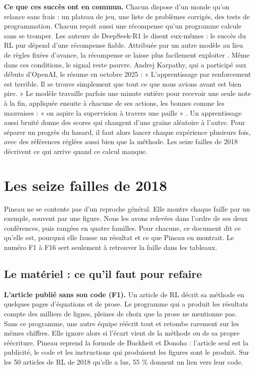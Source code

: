 \documentclass[11pt,a4paper]{article}
\begin{document}
\textbf{Ce que ces succès ont en commun.} Chacun dispose d'un monde
qu'on relance sans frais : un plateau de jeu, une liste de problèmes
corrigés, des tests de programmation. Chacun reçoit aussi une récompense
qu'un programme calcule sans se tromper. Les auteurs de DeepSeek-R1 le
disent eux-mêmes : le succès du RL pur dépend d'une récompense fiable.
Attribuée par un autre modèle au lieu de règles fixées d'avance, la
récompense se laisse plus facilement exploiter
\autocite{deepseek2025r1}. Même dans ces conditions, le signal reste
pauvre. Andrej Karpathy, qui a participé aux débuts d'OpenAI, le résume
en octobre 2025 : « L'apprentissage par renforcement est terrible. Il se
trouve simplement que tout ce que nous avions avant est bien pire. » Le
modèle travaille parfois une minute entière pour recevoir une seule note
à la fin, appliquée ensuite à chacune de ses actions, les bonnes comme
les mauvaises : « on aspire la supervision à travers une paille »
\autocite{patel2025karpathy}. Un apprentissage aussi bruité donne des
scores qui changent d'une graine aléatoire à l'autre. Pour séparer un
progrès du hasard, il faut alors lancer chaque expérience plusieurs
fois, avec des références réglées aussi bien que la méthode. Les seize
failles de 2018 décrivent ce qui arrive quand ce calcul manque.

\section{Les seize failles de 2018}\label{les-seize-failles-de-2018}

Pineau ne se contente pas d'un reproche général. Elle montre chaque
faille par un exemple, souvent par une figure. Nous les avons relevées
dans l'ordre de ses deux conférences, puis rangées en quatre familles.
Pour chacune, ce document dit ce qu'elle est, pourquoi elle fausse un
résultat et ce que Pineau en montrait. Le numéro F1 à F16 sert seulement
à retrouver la faille dans les tableaux.

\subsection{Le matériel : ce qu'il faut pour
refaire}\label{le-matuxe9riel-ce-quil-faut-pour-refaire}

\textbf{L'article publié sans son code (F1).} Un article de RL décrit sa
méthode en quelques pages d'équations et de prose. Le programme qui a
produit les résultats compte des milliers de lignes, pleines de choix
que la prose ne mentionne pas. Sans ce programme, une autre équipe
réécrit tout et retombe rarement sur les mêmes chiffres. Elle ignore
alors si l'écart vient de la méthode ou de sa propre réécriture. Pineau
reprend la formule de Buckheit et Donoho : l'article seul est la
publicité, le code et les instructions qui produisent les figures sont
le produit. Sur les 50 articles de RL de 2018 qu'elle a lus, 55 \%
donnent un lien vers leur code.
\end{document}
